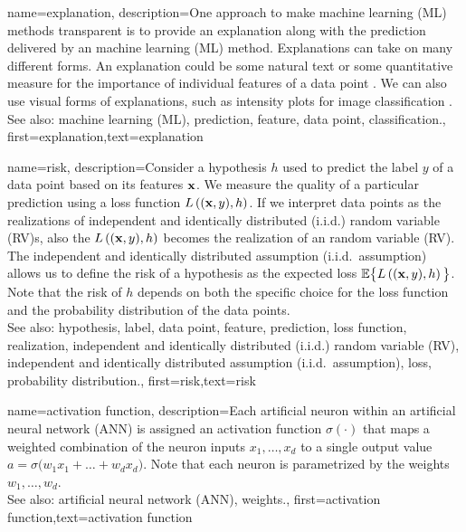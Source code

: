 {name={explanation},
	description={One approach to make machine learning (ML) methods transparent is to provide an 
		explanation along with the prediction delivered by an 
		machine learning (ML) method. Explanations can take on many different forms. An explanation 
		could be some natural text or some quantitative measure for the importance 
		of individual features of a data point \cite{Molnar2019}. We can also 
		use visual forms of explanations, such as intensity plots for image classification \cite{GradCamPaper}.
					\\ 
		See also: machine learning (ML), prediction, feature, data point, classification.},
	first={explanation},text={explanation} 
}

{name={risk},
	description={Consider a hypothesis $h$ used to predict the label 
		$y$ of a data point based on its features ${\bf x}$. We measure 
		the quality of a particular prediction using a loss function $L\left(({\bf x},y),h \right)$. 
		If we interpret data points as the realizations of independent and identically distributed (i.i.d.) random variable (RV)s, 
		also the $L\left(({\bf x},y),h \right)$ becomes the realization 
		of an random variable (RV). The independent and identically distributed assumption (i.i.d.\ assumption) allows us to define the risk of a hypothesis 
		as the expected loss $\mathbb{E}  \big\{L\left(({\bf x},y),h \right) \big\}$. 
		Note that the risk of $h$ depends on both the specific choice for the loss function and the 
		probability distribution of the data points.
					\\ 
		See also: hypothesis, label, data point, feature, prediction, loss function, realization, independent and identically distributed (i.i.d.) random variable (RV), independent and identically distributed assumption (i.i.d.\ assumption), loss, probability distribution.},
	first={risk},text={risk} 
}

{name={activation function},
	description={Each artificial neuron within an artificial neural network (ANN) is 
		assigned an activation function $\sigma(\cdot)$ that maps a weighted combination of 
		the neuron inputs $x_{1},\ldots,x_{d}$ to a single output 
		value $a = \sigma\big(w_{1} x_{1}+\ldots+w_{d} x_{d} \big)$. 
		Note that each neuron is parametrized by the weights $w_{1},\ldots,w_{d}$.
					\\ 
		See also: artificial neural network (ANN), weights.},
first={activation function},text={activation function} 
}

